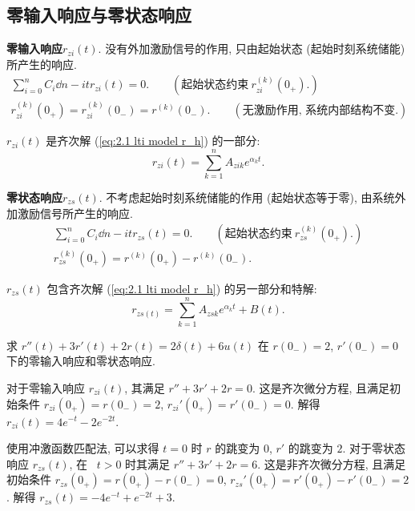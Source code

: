 \subsection{零输入响应与零状态响应}

\textbf{零输入响应}\quad $r_{zi}(t)$. 没有外加激励信号的作用, 只由起始状态 (起始时刻系统储能) 所产生的响应.
\begin{gather}
    \sum_{i=0}^{n}C_i\dd{n-i}{t}r_{zi}(t)=0.\qquad (\textrm{起始状态约束}\ r^{(k)}_{zi}(0_{+}).) \\
    r^{(k)}_{zi}(0_{+})=r^{(k)}_{zi}(0_{-})=r^{(k)}(0_{-}).\qquad (\textrm{无激励作用, 系统内部结构不变.}) \label{eq:2.3 r_zi 0+}
\end{gather}

$r_{zi}(t)$ 是齐次解 (\ref{eq:2.1 lti model r_h}) 的一部分:
\begin{equation}
    r_{zi}(t)=\sum_{k=1}^{n}A_{zik}e^{\alpha_k t}.
\end{equation}

\textbf{零状态响应}\quad $r_{zs}(t)$. 不考虑起始时刻系统储能的作用 (起始状态等于零), 由系统外加激励信号所产生的响应.
\begin{gather}
    \sum_{i=0}^{n}C_i\dd{n-i}{t}r_{zs}(t)=0.\qquad (\textrm{起始状态约束}\ r^{(k)}_{zs}(0_{+}).) \\
    r^{(k)}_{zs}(0_{+})=r^{(k)}(0_{+})-r^{(k)}(0_{-}). \label{eq:2.3 r_zs 0+}
\end{gather}

$r_{zs}(t)$ 包含齐次解 (\ref{eq:2.1 lti model r_h}) 的另一部分和特解:
\begin{equation}
    r_{zs(t)}=\sum_{k=1}^{n}A_{zsk}e^{\alpha_k t}+B(t).
\end{equation}

\begin{exampleprob}
    求 $r''(t)+3r'(t)+2r(t)=2\delta(t)+6u(t)$ 在 $r(0_-)=2$, $r'(0_-)=0$ 下的零输入响应和零状态响应.

    \begin{solution}
        对于零输入响应 $r_{zi}(t)$, 其满足 $r''+3r'+2r=0$. 这是齐次微分方程, 且满足初始条件 $r_{zi}(0_+)=r(0_-)=2$, $r_{zi}'(0_+)=r'(0_-)=0$. 解得 $r_{zi}(t)=4e^{-t}-2e^{-2t}$.

        使用冲激函数匹配法, 可以求得 $t=0$ 时 $r$ 的跳变为 $0$, $r'$ 的跳变为 $2$. 对于零状态响应 $r_{zs}(t)$, 在\ {\color{red} $t>0$} 时其满足 $r''+3r'+2r=6$. 这是非齐次微分方程, 且满足初始条件 $r_{zs}(0_+)=r(0_+)-r(0_-)=0$, $r_{zs}'(0_+)=r'(0_+)-r'(0_-)=2$. 解得 $r_{zs}(t)=-4e^{-t}+e^{-2t}+3$.
    \end{solution}
\end{exampleprob}

